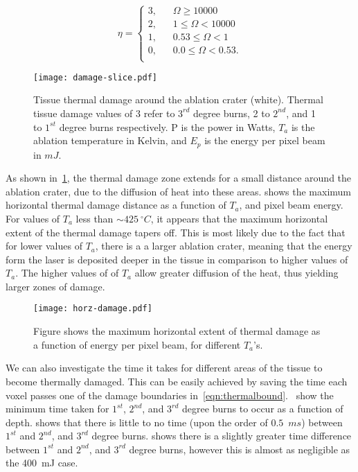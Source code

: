 \begin{equation}
\eta = 
     \begin{cases}
       \text{3,} &\quad \Omega \geq 10000\\
       \text{2,} &\quad 1 \leq \Omega < 10000\\
       \text{1,} &\quad 0.53 \leq \Omega < 1\\
       \text{0,} &\quad 0.0 \leq \Omega< 0.53.\\
     \end{cases}
\label{eqn:thermalbound}
\end{equation}

\begin{figure}[!h]
	\centering
	\texttt{[image: damage-slice.pdf]}
	\caption{Tissue thermal damage around the ablation crater (white). Thermal tissue damage values of 3 refer to $3^{rd}$ degree burns, 2 to $2^{nd}$, and 1 to $1^{st}$ degree burns respectively. P is the power in Watts, $T_a$ is the ablation temperature in Kelvin, and $E_p$ is the energy per pixel beam in $mJ$.}
	\label{fig:damfig}
\end{figure}
	
As shown in~\cref{fig:damfig}, the thermal damage zone extends for a small distance around the ablation crater, due to the diffusion of heat into these areas.  shows the maximum horizontal thermal damage distance as a function of $T_a$, and pixel beam energy. For values of $T_a$ less than $\sim 425~^{\circ}C$, it appears that the maximum horizontal extent of the thermal damage tapers off. This is most likely due to the fact that for lower values of $T_a$, there is a a larger ablation crater, meaning that the energy form the laser is deposited deeper in the tissue in comparison to higher values of $T_a$. The higher values of of $T_a$ allow greater diffusion of the heat, thus yielding larger zones of damage.

\begin{figure}
	\centering
	\texttt{[image: horz-damage.pdf]}
	\caption{Figure shows the maximum horizontal extent of thermal damage as a function of energy per pixel beam, for different $T_a$'s.}
	\label{fig:horz-70}
\end{figure}

\medskip

We can also investigate the time it takes for different areas of the tissue to become thermally damaged. This can be easily achieved by saving the time each voxel passes one of the damage boundaries in~\cref{eqn:thermalbound}.~ show the minimum time taken for $1^{st}$, $2^{nd}$, and $3^{rd}$ degree burns to occur as a function of depth.  shows that there is little to no time (upon the order of $0.5$~$ms$) between $1^{st}$ and $2^{nd}$, and $3^{rd}$ degree burns.
 shows there is a slightly greater time difference between $1^{st}$ and $2^{nd}$, and $3^{rd}$ degree burns, however this is almost as negligible as the 400~mJ case.

